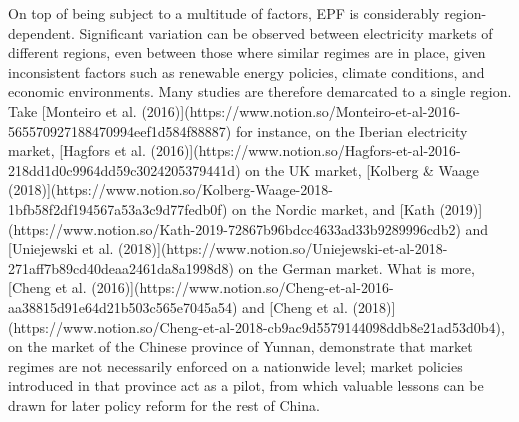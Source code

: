 On top of being subject to a multitude of factors, EPF is considerably region-dependent. Significant variation can be observed between electricity markets of different regions, even between those where similar regimes are in place, given inconsistent factors such as renewable energy policies, climate conditions, and economic environments. Many studies are therefore demarcated to a single region. Take [Monteiro et al. (2016)](https://www.notion.so/Monteiro-et-al-2016-565570927188470994eef1d584f88887) for instance, on the Iberian electricity market, [Hagfors et al. (2016)](https://www.notion.so/Hagfors-et-al-2016-218dd1d0c9964dd59c3024205379441d) on the UK market, [Kolberg & Waage (2018)](https://www.notion.so/Kolberg-Waage-2018-1bfb58f2df194567a53a3c9d77fedb0f) on the Nordic market, and [Kath (2019)](https://www.notion.so/Kath-2019-72867b96bdcc4633ad33b9289996cdb2) and [Uniejewski et al. (2018)](https://www.notion.so/Uniejewski-et-al-2018-271aff7b89cd40deaa2461da8a1998d8) on the German market. What is more, [Cheng et al. (2016)](https://www.notion.so/Cheng-et-al-2016-aa38815d91e64d21b503c565e7045a54) and [Cheng et al. (2018)](https://www.notion.so/Cheng-et-al-2018-cb9ac9d5579144098ddb8e21ad53d0b4), on the market of the Chinese province of Yunnan, demonstrate that market regimes are not necessarily enforced on a nationwide level; market policies introduced in that province act as a pilot, from which valuable lessons can be drawn for later policy reform for the rest of China.

